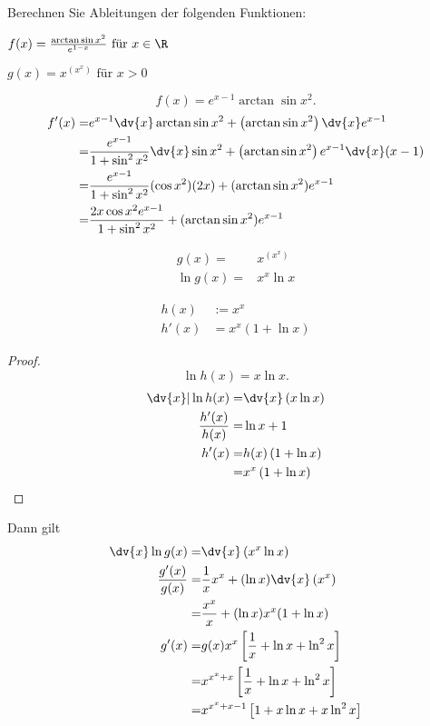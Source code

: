 \begin{Problem}
Berechnen Sie Ableitungen der folgenden Funktionen:
\begin{parts}
	\item $f(x)=\frac{\arctan\sin x^2}{e^{1-x}}\text{ f\"{u}r }x\in \R$ 
	\item $g(x)=x^{(x^x)}\text{ f\"{u}r }x>0$
\end{parts}
\end{Problem}

	\begin{parts}
		\item 
			\[
				f(x)=e^{x-1}\arctan\sin x^2
			.\] 
			\begin{align*}
				f'(x)=& e^{x-1}\dv{x}\arctan\sin x^2+\left( \arctan\sin x^2 \right) \dv{x}e^{x-1}\\
			=&\frac{e^{x-1}}{1+\sin^2 x^2}\dv{x}\sin x^2+\left( \arctan\sin x^2 \right)e^{x-1}\dv{x}(x-1)\\
			=&\frac{e^{x-1}}{1+\sin^2 x^2}(\cos x^2)(2x)+(\arctan\sin x^2)e^{x-1}\\
			=& \frac{2x\cos x^2 e^{x-1}}{1+\sin^2 x^2}+(\arctan\sin x^2)e^{x-1}
			\end{align*}
		\item 
			\begin{align*}
				g(x)=& x^{(x^x)}\\
				\ln g(x)=& x^x\ln x
			\end{align*}

			\begin{Lemma}
				\begin{align*}
					h(x)&:=x^x\\
					h'(x)&=x^x(1+\ln x)
				\end{align*}
			\end{Lemma}
			\begin{proof}
				\[
				\ln h(x)=x\ln x
				.\] 
				\begin{align*}
					\dv{x}|\ln h(x)=&\dv{x}\left( x\ln x \right) \\
					\frac{h'(x)}{h(x)}=&\ln x+1\\
					h'(x)=&h(x)\left( 1+\ln x \right) \\
					=&x^x\left( 1+\ln x \right) 
				\end{align*}
			\end{proof}
			Dann gilt
	\begin{align*}
		\dv{x}\ln g(x)=&\dv{x}\left( x^x \ln x \right) \\
		\frac{g'(x)}{g(x)}=&\frac{1}{x}x^x+(\ln x)\dv{x}\left( x^x \right) \\
		=&\frac{x^x}{x}+(\ln x)x^x (1+\ln x)\\
		g'(x)=&g(x)x^x\left[ \frac{1}{x}+\ln x+\ln^2x \right] \\
		=& x^{x^x+x}\left[ \frac{1}{x}+\ln x+\ln^2x \right] \\
		=& x^{x^x+x-1}\left[ 1+x\ln x+x\ln^2 x \right] 
	\end{align*}
		\end{parts}

